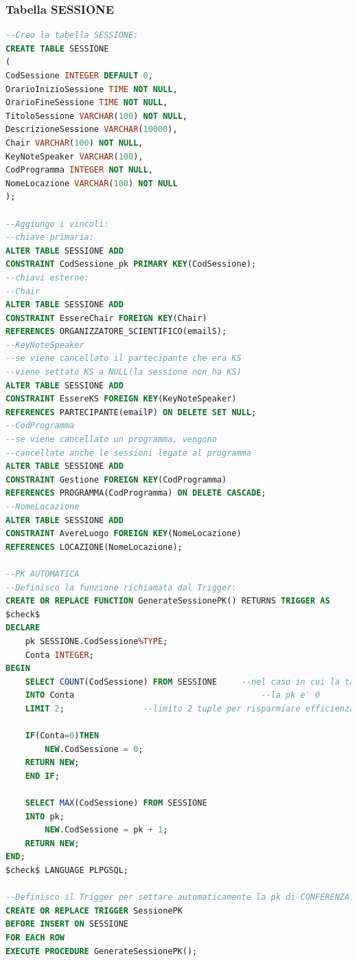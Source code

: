 \documentclass[a4page]{article}
\begin{document}
\subsubsection{Tabella SESSIONE}
\begin{lstlisting}[language=SQL,
        deletekeywords={IDENTITY,INT},
        morekeywords={clustered},    
        framesep=10pt,
        framextopmargin=10pt]
--Creo la tabella SESSIONE: 
CREATE TABLE SESSIONE
(
CodSessione INTEGER DEFAULT 0,
OrarioInizioSessione TIME NOT NULL,
OrarioFineSessione TIME NOT NULL,
TitoloSessione VARCHAR(100) NOT NULL,
DescrizioneSessione VARCHAR(10000),
Chair VARCHAR(100) NOT NULL,
KeyNoteSpeaker VARCHAR(100),
CodProgramma INTEGER NOT NULL,
NomeLocazione VARCHAR(100) NOT NULL
);

--Aggiungo i vincoli:
--chiave primaria:
ALTER TABLE SESSIONE ADD
CONSTRAINT CodSessione_pk PRIMARY KEY(CodSessione);
--chiavi esterne:
--Chair
ALTER TABLE SESSIONE ADD
CONSTRAINT EssereChair FOREIGN KEY(Chair)
REFERENCES ORGANIZZATORE_SCIENTIFICO(emailS);
--KeyNoteSpeaker
--se viene cancellato il partecipante che era KS
--viene settato KS a NULL(la sessione non ha KS)
ALTER TABLE SESSIONE ADD
CONSTRAINT EssereKS FOREIGN KEY(KeyNoteSpeaker)
REFERENCES PARTECIPANTE(emailP) ON DELETE SET NULL;
--CodProgramma
--se viene cancellato un programma, vengono
--cancellate anche le sessioni legate al programma
ALTER TABLE SESSIONE ADD
CONSTRAINT Gestione FOREIGN KEY(CodProgramma)
REFERENCES PROGRAMMA(CodProgramma) ON DELETE CASCADE;
--NomeLocazione
ALTER TABLE SESSIONE ADD
CONSTRAINT AvereLuogo FOREIGN KEY(NomeLocazione)
REFERENCES LOCAZIONE(NomeLocazione);

--PK AUTOMATICA
--Definisco la funzione richiamata dal Trigger:
CREATE OR REPLACE FUNCTION GenerateSessionePK() RETURNS TRIGGER AS
$check$
DECLARE
	pk SESSIONE.CodSessione%TYPE;
	Conta INTEGER;
BEGIN
	SELECT COUNT(CodSessione) FROM SESSIONE		--nel caso in cui la tabella sia vuota
	INTO Conta										--la pk e' 0
	LIMIT 2;				--limito 2 tuple per risparmiare efficienza di calcolo
	
	IF(Conta=0)THEN				
		NEW.CodSessione = 0;	
	RETURN NEW;
	END IF;
	
	SELECT MAX(CodSessione) FROM SESSIONE
	INTO pk;
		NEW.CodSessione = pk + 1;
	RETURN NEW;
END;
$check$ LANGUAGE PLPGSQL;

--Definisco il Trigger per settare automaticamente la pk di CONFERENZA:
CREATE OR REPLACE TRIGGER SessionePK
BEFORE INSERT ON SESSIONE
FOR EACH ROW
EXECUTE PROCEDURE GenerateSessionePK();        

\end{lstlisting}
\end{document}
